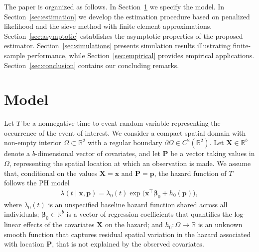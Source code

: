 \documentclass[11pt]{article}
\begin{document}
The paper is organized as follows. In Section~\ref{sec:model} we specify the model. In Section~\ref{sec:estimation} we develop the estimation procedure based on penalized likelihood and the sieve method with finite element approximations. Section~\ref{sec:asymptotic} establishes the asymptotic properties of the proposed estimator. Section~\ref{sec:simulations} presents simulation results illustrating finite-sample performance, while Section~\ref{sec:empirical} provides empirical applications. Section~\ref{sec:conclusion} contains our concluding remarks.


\section{Model}\label{sec:model}
Let $T$ be a nonnegative time-to-event random variable representing the occurrence of the event of interest. We consider a compact spatial domain with non-empty interior $\Omega \subset \mathbb{R}^2$ with a regular boundary $\partial \Omega \in C^2(\mathbb{R}^2)$. 
Let $\bm{X} \in \mathbb{R}^b$ denote a $b$-dimensional vector of covariates, and let $\bm{P}$ be a vector taking values in $\Omega$, representing the spatial location at which an observation is made. 
We assume that, conditional on the values $\bm{X} = \bm {x}$ and $\bm{P} = \bm{p}$, the hazard function of $T$ follows the PH model
\begin{align}\label{eq:model}
	\lambda(t \mid \bm{x}, \bm{p})
	= \lambda_0(t) \exp\!\big( \bm{x}^\top \bm{\beta}_0 + h_0(\bm{p}) \big),
\end{align}
where $\lambda_0(t)$ is an unspecified baseline hazard function shared across all individuals; $\boldsymbol{\beta}_0 \in \mathbb{R}^b$ is a vector of regression coefficients that quantifies the log-linear effects of the covariates $\boldsymbol{X}$ on the hazard; and $h_0 : \Omega \to \mathbb{R}$ is an unknown smooth function that captures residual spatial variation in the hazard associated with location $\boldsymbol{P}$, that is not explained by the observed covariates.
\end{document}
